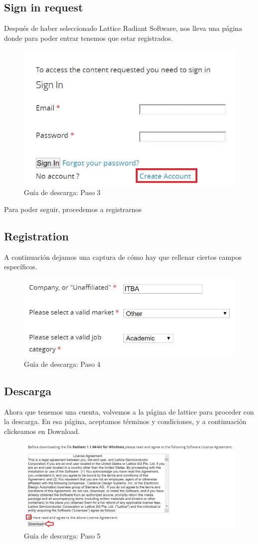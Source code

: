 \documentclass{article}
\begin{document}
\subsection{Sign in request}
Después de haber seleccionado Lattice Radiant Software, nos lleva una página donde para poder entrar tenemos que estar registrados.

\begin{figure}[H]
\centering
\includegraphics[width=0.4\linewidth]{Imagenes/3.JPG}
\caption{Guía de descarga: Paso 3}
\label{fig:step3}
\end{figure}

Para poder seguir, procedemos a registrarnos

\subsection{Registration}
A continuación dejamos una captura de cómo hay que rellenar ciertos campos específicos.

\begin{figure}[H]
\centering
\includegraphics[width=0.4\linewidth]{Imagenes/4.JPG}
\caption{Guía de descarga: Paso 4}
\label{fig:step4}
\end{figure}

\subsection{Descarga}
Ahora que tenemos una cuenta, volvemos a la página de lattice para proceder con la descarga. En esa página, aceptamos términos y condiciones, y a continuación clickeamos en Download.

\begin{figure}[H]
\centering
\includegraphics[width=1\linewidth]{Imagenes/5.JPG}
\caption{Guía de descarga: Paso 5}
\label{fig:step5}
\end{figure}
\end{document}
